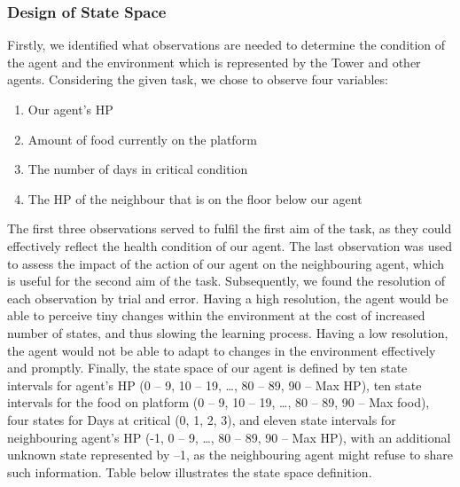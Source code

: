 \subsubsection{Design of State Space}
Firstly, we identified what observations are needed to determine the condition of the agent and the environment which is represented by the Tower and other agents. Considering the given task, we chose to observe four variables: 
\begin{enumerate}
    \item Our agent's HP
    \item Amount of food currently on the platform
    \item The number of days in critical condition
    \item The HP of the neighbour that is on the floor below our agent
\end{enumerate}

The first three observations served to fulfil the first aim of the task, as they could effectively reflect the health condition of our agent. The last observation was used to assess the impact of the action of our agent on the neighbouring agent, which is useful for the second aim of the task. Subsequently, we found the resolution of each observation by trial and error. Having a high resolution, the agent would be able to perceive tiny changes within the environment at the cost of increased number of states, and thus slowing the learning process. Having a low resolution, the agent would not be able to adapt to changes in the environment effectively and promptly. Finally, the state space of our agent is defined by ten state intervals for agent’s HP (0 – 9, 10 – 19, …, 80 – 89, 90 – Max HP), ten state intervals for the food on platform (0 – 9, 10 – 19, …, 80 – 89, 90 – Max food), four states for Days at critical (0, 1, 2, 3), and eleven state intervals for neighbouring agent’s HP (-1, 0 – 9, …, 80 – 89, 90 – Max HP), with an additional unknown state represented by –1, as the neighbouring agent might refuse to share such information. Table below illustrates the state space definition.

